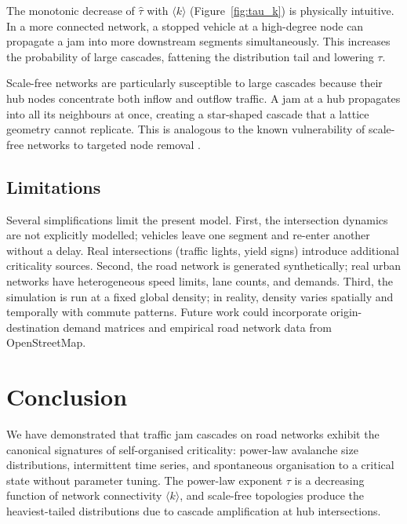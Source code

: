 \documentclass[12pt,a4paper]{article}
\begin{document}
The monotonic decrease of $\hat{\tau}$ with $\langle k \rangle$ 
(Figure~\ref{fig:tau_k}) is physically intuitive. In a more 
connected network, a stopped vehicle at a high-degree node can 
propagate a jam into more downstream segments simultaneously. This 
increases the probability of large cascades, fattening the 
distribution tail and lowering $\tau$.

Scale-free networks are particularly susceptible to large cascades 
because their hub nodes concentrate both inflow and outflow traffic. 
A jam at a hub propagates into all its neighbours at once, 
creating a star-shaped cascade that a lattice geometry cannot 
replicate. This is analogous to the known vulnerability of 
scale-free networks to targeted node removal \citep{barabasi1999}.

\subsection{Limitations}
\label{subsec:limits}

Several simplifications limit the present model. First, the 
intersection dynamics are not explicitly modelled; vehicles leave 
one segment and re-enter another without a delay. Real intersections 
(traffic lights, yield signs) introduce additional criticality 
sources. Second, the road network is generated synthetically; real 
urban networks have heterogeneous speed limits, lane counts, and 
demands. Third, the simulation is run at a fixed global density; 
in reality, density varies spatially and temporally with commute 
patterns. Future work could incorporate origin-destination demand 
matrices and empirical road network data from OpenStreetMap.

\section{Conclusion}
\label{sec:conclusion}

We have demonstrated that traffic jam cascades on road networks 
exhibit the canonical signatures of self-organised criticality: 
power-law avalanche size distributions, intermittent time series, 
and spontaneous organisation to a critical state without parameter 
tuning. The power-law exponent $\tau$ is a decreasing function of 
network connectivity $\langle k \rangle$, and scale-free topologies 
produce the heaviest-tailed distributions due to cascade amplification 
at hub intersections.
\end{document}
